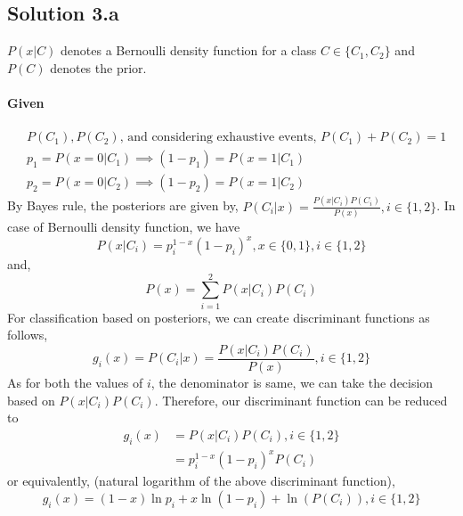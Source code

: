 \subsection*{Solution 3.a}
$P(x|C)$ denotes a Bernoulli density function for a class $C \in \{C_1, C_2\}$
and $P(C)$ denotes the prior.
\paragraph{Given}
\begin{equation*}
	\begin{split}
		& P(C_1), P(C_2) \text{, and considering exhaustive events, } P(C_1) + P(C_2) = 1\\
		& p_1 = P(x=0|C_1) \implies (1-p_1) = P(x=1|C_1)\\
		& p_2 = P(x=0|C_2) \implies (1-p_2) = P(x=1|C_2)
	\end{split}
\end{equation*}
By Bayes rule, the posteriors are given by, $P(C_i|x) = \frac{P(x|C_i)P(C_i)}{P(x)}, i \in \{1,2\}$.
\newline
In case of Bernoulli density function, we have
\begin{equation*}
	P(x|C_i) = p_i^{1-x}(1-p_i)^x, x \in \{0,1\}, i \in \{1,2\}
\end{equation*}
and,
\begin{equation*}
	P(x) = \sum_{i=1}^{2} P(x|C_i)P(C_i)
\end{equation*}
For classification based on posteriors, we can create discriminant functions as follows,
\begin{equation*}
	g_i(x) = P(C_i|x) = \frac{P(x|C_i)P(C_i)}{P(x)}, i \in \{1,2\}
\end{equation*}
As for both the values of $i$, the denominator is same, we can take the decision based on $P(x|C_i)P(C_i)$. Therefore, our discriminant function can be reduced to
\begin{equation}
	\begin{split}
		g_i(x) 	&= P(x|C_i)P(C_i), i \in \{1,2\}\\
				&= p_i^{1-x}(1-p_i)^x P(C_i)
	\end{split}
\end{equation}
or equivalently, (natural logarithm of the above discriminant function),
\begin{equation}\label{eq:log_discriminant}
	g_i(x) = (1-x)\ln p_i + x \ln (1-p_i) + \ln (P(C_i)), i \in \{1,2\}
\end{equation}
